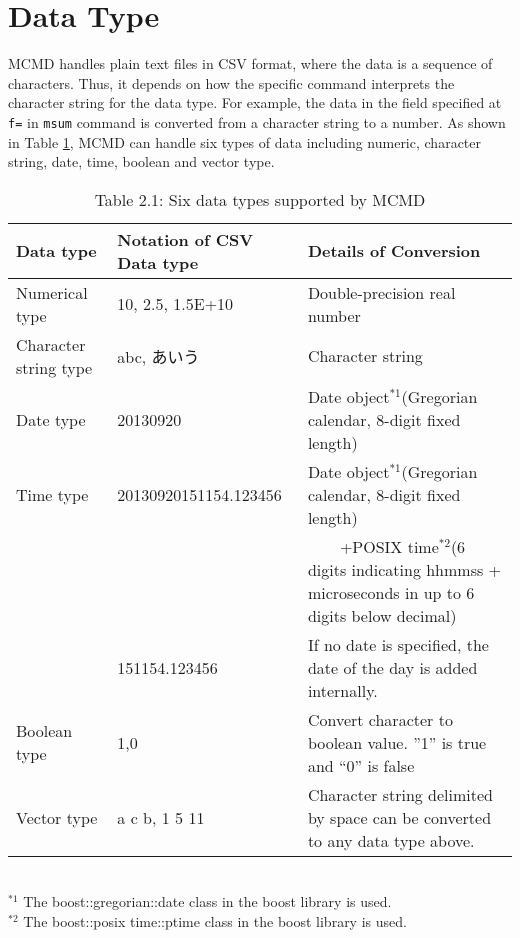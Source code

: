
%

\section{Data Type\label{sect:datatype}}
MCMD handles plain text files in CSV format, where the data is a sequence of characters. Thus, it depends on how the specific command interprets the character string for the data type. For example, the data in the field specified at \verb|f=| in \verb|msum| command is converted from a character string to a number. As shown in Table \ref{tbl:datatype_types}, MCMD can handle six types of data including numeric, character string, date, time, boolean and vector type.

\begin{table}[!hb]
\begin{center}
\caption{Table 2.1: Six data types supported by MCMD\label{tbl:datatype_types}}
{\small
  \begin{tabular}{l|l|l} \hline
Data type             & Notation of CSV Data type & Details of Conversion \\ \hline
Numerical type        & 10, 2.5, 1.5E+10          & Double-precision real number \\
Character string type & abc, あいう               & Character string \\
Date type             & 20130920                  & Date object$^{*1}$(Gregorian calendar, 8-digit fixed length) \\
Time type             & 20130920151154.123456     & Date object$^{*1}$(Gregorian calendar, 8-digit fixed length) \\
                      &                           & \ \ \ \ +POSIX time$^{*2}$(6 digits indicating hhmmss + microseconds in up to 6 digits below decimal) \\
                      & 151154.123456             & If no date is specified, the date of the day is added internally. \\
Boolean type          & 1,0                       & Convert character to boolean value. ”1” is true and “0” is false \\
Vector type           & a c b, 1 5 11             & Character string delimited by space can be converted to any data type above. \\
\hline
  \end{tabular}
\\
$^{*1}$ The boost::gregorian::date class in the boost library is used. \\
$^{*2}$ The boost::posix time::ptime class in the boost library is used. \\
  }
  \end{center}
\end{table}

